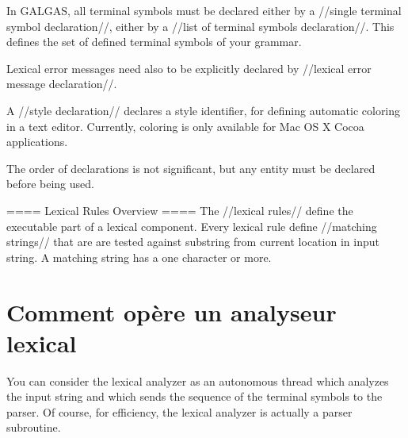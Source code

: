 In GALGAS, all terminal symbols must be declared either by a //single terminal symbol declaration//, either by a //list of terminal symbols declaration//. This defines the set of defined terminal symbols of your grammar.

Lexical error messages need also to be explicitly declared by //lexical error message declaration//. 

A //style declaration// declares a style identifier, for defining automatic coloring in a text editor. Currently, coloring is only available for Mac OS X Cocoa applications.

The order of declarations is not significant, but any entity must be declared before being used.

==== Lexical Rules Overview ====
The //lexical rules// define the executable part of a lexical component. Every lexical rule define //matching strings// that are are tested against substring from current location in input string. A matching string has a one character or more.

%
%


\section{Comment opère un analyseur lexical}

You can consider the lexical analyzer as an autonomous thread which analyzes the input string and which sends the sequence of the terminal symbols to the parser. Of course, for efficiency, the lexical analyzer is actually a parser subroutine.

